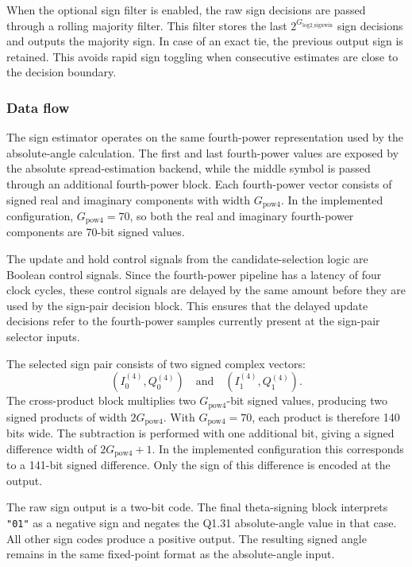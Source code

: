 When the optional sign filter is enabled, the raw sign decisions are passed through a rolling majority filter. This filter stores the last \(2^{G_{\mathrm{log2\_signwin}}}\) sign decisions and outputs the majority sign. In case of an exact tie, the previous output sign is retained. This avoids rapid sign toggling when consecutive estimates are close to the decision boundary.

\subsubsection{Data flow}

The sign estimator operates on the same fourth-power representation used by the absolute-angle calculation. The first and last fourth-power values are exposed by the absolute spread-estimation backend, while the middle symbol is passed through an additional fourth-power block. Each fourth-power vector consists of signed real and imaginary components with width \(G_{\mathrm{pow4}}\). In the implemented configuration, \(G_{\mathrm{pow4}} = 70\), so both the real and imaginary fourth-power components are 70-bit signed values.

The update and hold control signals from the candidate-selection logic are Boolean control signals. Since the fourth-power pipeline has a latency of four clock cycles, these control signals are delayed by the same amount before they are used by the sign-pair decision block. This ensures that the delayed update decisions refer to the fourth-power samples currently present at the sign-pair selector inputs.

The selected sign pair consists of two signed complex vectors:
\[
    (I_0^{(4)}, Q_0^{(4)}) \quad \text{and} \quad
    (I_1^{(4)}, Q_1^{(4)}).
\]
The cross-product block multiplies two \(G_{\mathrm{pow4}}\)-bit signed values, producing two signed products of width \(2G_{\mathrm{pow4}}\). With \(G_{\mathrm{pow4}} = 70\), each product is therefore 140 bits wide. The subtraction is performed with one additional bit, giving a signed difference width of \(2G_{\mathrm{pow4}}+1\). In the implemented configuration this corresponds to a 141-bit signed difference. Only the sign of this difference is encoded at the output.

The raw sign output is a two-bit code. The final theta-signing block interprets \texttt{"01"} as a negative sign and negates the Q1.31 absolute-angle value in that case. All other sign codes produce a positive output. The resulting signed angle remains in the same fixed-point format as the absolute-angle input.

